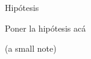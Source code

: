 \begin{frame}{\color{blue}Hipótesis}
  
  \begin{center}
    Poner la hipótesis acá
  \end{center}

  \vspace{2ex}
  \begin{center}
    \scriptsize (a small note)
  \end{center}

\end{frame}
